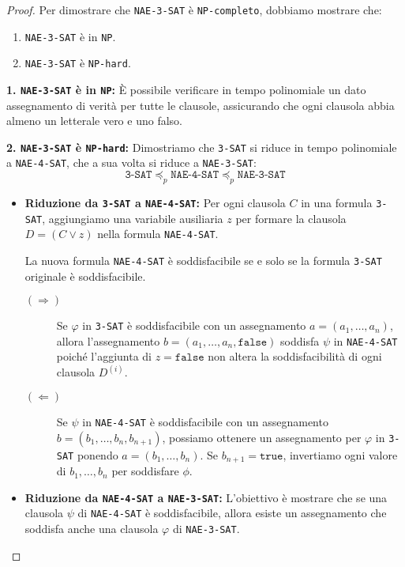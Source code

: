 \begin{proof}
Per dimostrare che \texttt{NAE-3-SAT} è \texttt{NP-completo}, dobbiamo mostrare che:
\begin{enumerate}
    \item \texttt{NAE-3-SAT} è in \texttt{NP}.
    \item \texttt{NAE-3-SAT} è \texttt{NP-hard}.
\end{enumerate}
\textbf{1. \texttt{NAE-3-SAT} è in \texttt{NP}:} È possibile verificare in tempo
polinomiale un dato assegnamento di verità per tutte le clausole, assicurando che
ogni clausola abbia almeno un letterale vero e uno falso.

\textbf{2. \texttt{NAE-3-SAT} è \texttt{NP-hard}:} Dimostriamo che \texttt{3-SAT}
si riduce in tempo polinomiale a \texttt{NAE-4-SAT}, che a sua volta si riduce
a \texttt{NAE-3-SAT}:
\[
  \texttt{3-SAT} \preceq_p \texttt{NAE-4-SAT} \preceq_p \texttt{NAE-3-SAT}
\]
\begin{itemize}
    \item \textbf{Riduzione da \texttt{3-SAT} a \texttt{NAE-4-SAT}:} Per ogni
    clausola $C$ in una formula \texttt{3-SAT}, aggiungiamo una variabile ausiliaria
    $z$ per formare la clausola $D = (C \lor z)$ nella formula \texttt{NAE-4-SAT}.
    
    La nuova formula \texttt{NAE-4-SAT}
    è soddisfacibile se e solo se la formula \texttt{3-SAT} originale è soddisfacibile.
        \begin{description}
            \item[$(\Rightarrow)$] Se $\varphi$ in \texttt{3-SAT} è soddisfacibile con
            un assegnamento $a = (a_1, \dots, a_n)$, allora l'assegnamento $b =
            (a_1, \dots, a_n, \texttt{false})$ soddisfa $\psi$ in \texttt{NAE-4-SAT}
            poiché l'aggiunta di $z = \texttt{false}$ non altera la soddisfacibilità
            di ogni clausola $D^{(i)}$.
            \item[$(\Leftarrow)$] Se $\psi$ in \texttt{NAE-4-SAT} è soddisfacibile
            con un assegnamento $b = (b_1, \dots, b_n, b_{n+1})$, possiamo ottenere
            un assegnamento per $\varphi$ in \texttt{3-SAT} ponendo $a = (b_1, \dots, b_n)$.
            Se $b_{n+1} = \texttt{true}$, invertiamo ogni valore di $b_1, \dots, b_n$
        per soddisfare $\phi$.
        \end{description}
    \item \textbf{Riduzione da \texttt{NAE-4-SAT} a \texttt{NAE-3-SAT}:} 
    L'obiettivo è mostrare che se una clausola $\psi$ di \texttt{NAE-4-SAT} è 
    soddisfacibile, allora esiste un assegnamento che soddisfa anche una clausola
    $\varphi$ di \texttt{NAE-3-SAT}.


\end{itemize}
\end{proof}
